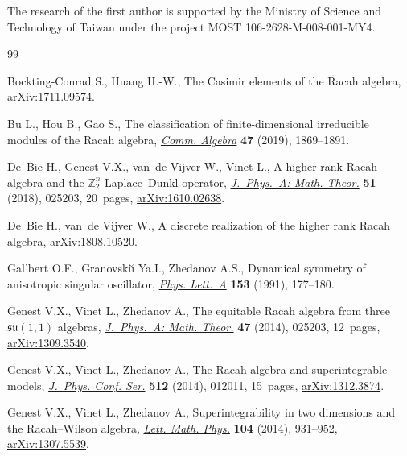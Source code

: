 \documentclass[pdftex]{sigma}
\numberwithin{equation}{section}
\begin{document}
The research of the first author is supported by the Ministry of Science and Technology of Taiwan under the project MOST 106-2628-M-008-001-MY4.

\begin{thebibliography}{99}
\footnotesize\itemsep=0pt

Bockting-Conrad S., Huang H.-W., The {C}asimir elements of the {R}acah algebra,
 \href{https://arxiv.org/abs/1711.09574}{arXiv:1711.09574}.

Bu L., Hou B., Gao S., The classification of finite-dimensional irreducible
 modules of the {R}acah algebra, \href{https://doi.org/10.1080/00927872.2018.1524004}{\textit{Comm. Algebra}} \textbf{47} (2019), 1869--1891.

De~Bie H., Genest V.X., van~de Vijver W., Vinet L., A higher rank {R}acah
 algebra and the {${\mathbb Z}^n_2$} {L}aplace--{D}unkl operator,
 \href{https://doi.org/10.1088/1751-8121/aa9756}{\textit{J.~Phys.~A: Math. Theor.}} \textbf{51} (2018), 025203, 20~pages, \href{https://arxiv.org/abs/1610.02638}{arXiv:1610.02638}.

De~Bie H., van~de Vijver W., A discrete realization of the higher rank {R}acah
 algebra, \href{https://arxiv.org/abs/1808.10520}{arXiv:1808.10520}.

Gal'bert O.F., Granovski\u{\i} Ya.I., Zhedanov A.S., Dynamical symmetry of
 anisotropic singular oscillator, \href{https://doi.org/10.1016/0375-9601(91)90789-B}{\textit{Phys. Lett.~A}} \textbf{153} (1991), 177--180.

Genest V.X., Vinet L., Zhedanov A., The equitable {R}acah algebra from three
 {$\mathfrak{su}(1,1)$} algebras, \href{https://doi.org/10.1088/1751-8113/47/2/025203}{\textit{J.~Phys.~A: Math. Theor.}} \textbf{47} (2014), 025203, 12~pages, \href{https://arxiv.org/abs/1309.3540}{arXiv:1309.3540}.

Genest V.X., Vinet L., Zhedanov A., The {R}acah algebra and superintegrable
 models, \href{https://doi.org/10.1088/1742-6596/512/1/012011}{\textit{J.~Phys. Conf. Ser.}} \textbf{512} (2014), 012011, 15~pages, \href{https://arxiv.org/abs/1312.3874}{arXiv:1312.3874}.

Genest V.X., Vinet L., Zhedanov A., Superintegrability in two dimensions and
 the {R}acah--{W}ilson algebra, \href{https://doi.org/10.1007/s11005-014-0697-y}{\textit{Lett. Math. Phys.}} \textbf{104} (2014), 931--952, \href{https://arxiv.org/abs/1307.5539}{arXiv:1307.5539}.


\end{thebibliography}
\end{document}
